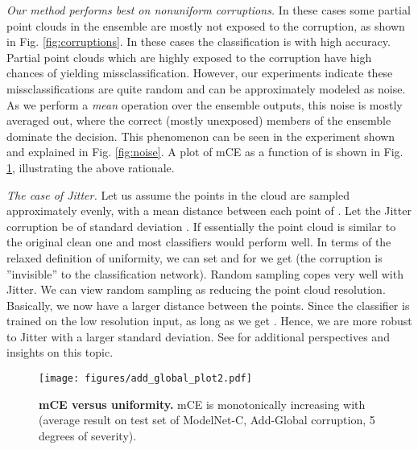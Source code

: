 \documentclass[10pt,twocolumn]{article}
\begin{document}
\emph{Our method performs best on nonuniform corruptions.}
In these cases some partial point clouds in the ensemble are mostly not exposed to the corruption, as shown in Fig. \ref{fig:corruptions}.
In these cases the classification is with high accuracy. Partial point clouds which are highly exposed to the corruption have high chances of yielding missclassification. However, our experiments indicate these missclassifications are quite random and can be approximately modeled as noise. As we perform a \emph{mean} operation over the ensemble outputs, this noise is mostly averaged out, where the correct (mostly unexposed) members of the ensemble dominate the decision. This phenomenon can be seen in the experiment shown and explained in Fig. \ref{fig:noise}. A plot of mCE as a function of  is shown in Fig. \ref{fig:add_global_plot}, illustrating the above rationale.

\emph{The case of Jitter.}
Let us assume the points in the cloud are sampled approximately evenly, with a mean distance between each point of . Let the Jitter corruption be of standard deviation .
If  essentially the point cloud is similar to the original clean one and most classifiers would perform well. In terms of the relaxed definition of uniformity, we can set  and for  we get  (the corruption is ''invisible'' to the classification network).
Random sampling copes very well with Jitter. We can view random sampling as reducing the point cloud resolution. Basically, we now have a larger distance  between the points. Since the classifier is trained on the low resolution input, as long as  we get . Hence, we are more robust to Jitter with a larger standard deviation. See \cite{pointguard} for additional perspectives and insights on this topic.


\begin{figure}[!ptbh]
  \centering
\texttt{[image: figures/add\_global\_plot2.pdf]}
   \caption{\textbf{mCE versus uniformity.} mCE is monotonically increasing with  (average result on test set of ModelNet-C, Add-Global corruption, 5 degrees of severity).}
   \label{fig:add_global_plot}
\end{figure}
\end{document}
